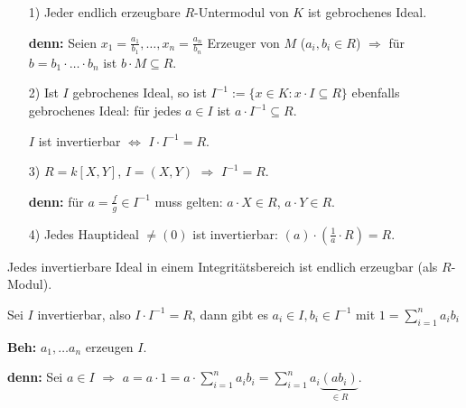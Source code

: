 \documentclass[a4paper, 10pt]{report}
\begin{document}
\begin{nnBsp}
\begin{enumerate}
\item[1)] Jeder endlich erzeugbare $R$-Untermodul von $K$ ist gebrochenes Ideal.

\textbf{denn:} Seien $x_1 = \frac{a_1}{b_1}, \ldots, x_n = \frac{a_n}{b_n}$ Erzeuger von $M$ ($a_i, b_i \in R$) $\Rightarrow$ f\"ur $b = b_1 \cdot \ldots \cdot b_n$ ist $b \cdot M \subseteq R$.

\item[2)] Ist $I$ gebrochenes Ideal, so ist $I^{-1} := \{ x \in K : x \cdot I \subseteq R \}$ ebenfalls gebrochenes Ideal: f\"ur jedes $a \in I$ ist $a \cdot I^{-1} \subseteq R$.

$I$ ist invertierbar $\Leftrightarrow$ $I \cdot I^{-1} = R$.

\item[3)] $R = k[X,Y]$, $I = (X,Y)$ $\Rightarrow$ $I^{-1} = R$.

\textbf{denn:} f\"ur $a = \frac{f}{g} \in I^{-1}$ muss gelten: $a \cdot X \in R$, $a \cdot Y \in R$.

\item[4)] Jedes Hauptideal $\neq (0)$ ist invertierbar: $(a) \cdot (\frac{1}{a} \cdot R) = R$.
\end{enumerate}
\end{nnBsp}

\begin{Bem}\label{2.41}
Jedes invertierbare Ideal in einem Integrit\"atsbereich ist endlich erzeugbar (als $R$-Modul).

\begin{Bew}
Sei $I$ invertierbar, also $I \cdot I^{-1} = R$, dann gibt es $a_i \in I, b_i \in I^{-1}$ mit $1 = \sum_{i=1}^{n} a_i b_i$

\textbf{Beh:} $a_1, \ldots a_n$ erzeugen $I$.

\textbf{denn:} Sei $a \in I$ $\Rightarrow$ $a = a \cdot 1 = a \cdot \sum_{i=1}^{n} a_i b_i = \sum_{i=1}^{n} a_i \underbrace{(a b_i)}_{\in R}$.

\end{Bew}
\end{Bem}
\end{document}

